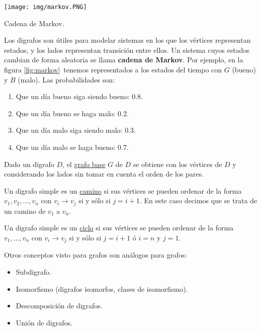 \begin{ejem}
    \begin{marginfigure}
        \centering
        \texttt{[image: img/markov.PNG]}
        \caption{Cadena de Markov.}
        \label{fig:markov}
    \end{marginfigure}
    
    Los digrafos son útiles para modelar sistemas en los que los vértices representan estados, y los lados representan transición entre ellos. Un sistema cuyos estados cambian de forma aleatoria se llama \textbf{cadena de Markov}. Por ejemplo, en la figura \ref{fig:markov}~tenemos representados a los estados del tiempo con $G$ (bueno) y $B$ (malo). Las probabilidades son:
    
    \begin{enumerate}
        \item Que un día bueno siga siendo bueno: $0.8$.
        \item Que un día bueno se haga malo: $0.2$.
        \item Que un día malo siga siendo malo: $0.3$.
        \item Que un día malo se haga bueno: $0.7$.
    \end{enumerate}
\end{ejem}

\begin{defn}
    Dado un digrafo $D$, el \ul{grafo base} $G$ de $D$ se obtiene con los vértices de $D$ y considerando los lados sin tomar en cuenta el orden de los pares.
\end{defn}

\begin{defn}
    Un digrafo simple es un \ul{camino} si sus vértices se pueden ordenar de la forma $v_1, v_2, \dots, v_n$ con $v_i \rightarrow v_j$ si y sólo si $j = i+1$. En este caso decimos que se trata de un camino de $v_1$ a $v_n$.
    
    Un digrafo simple es un \ul{ciclo} si sus vértices se pueden ordenar de la forma $v_1, \dots, v_n$ con $v_i \rightarrow v_j$ si y sólo si $j = i+1$ ó $i=n$ y $j=1$.
    
    Otros conceptos visto para grafos son análogos para grafos:
    
    \begin{itemize}
        \item Subdigrafo.
        \item Isomorfismo (digrafos isomorfos, clases de isomorfismo).
        \item Descomposición de digrafos.
        \item Unión de digrafos.
    \end{itemize}
\end{defn}

